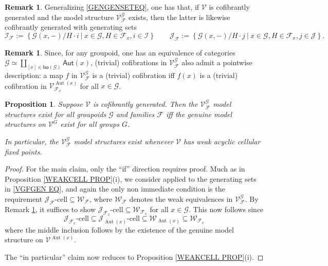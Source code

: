 \documentclass[a4paper,10pt
,draft
]{article}%
\numberwithin{equation}{section}
\numberwithin{figure}{section}
\newtheorem{proposition}[equation]{Proposition}%
\theoremstyle{definition} %
\newtheorem{remark}[equation]{Remark}%
\DeclareMathOperator{\Aut}{Aut}%
\newcommand{\F}{\ensuremath{\mathcal F}}
\newcommand{\V}{\ensuremath{\mathcal V}}
\newcommand{\G}{\ensuremath{\mathcal G}}
\newcommand{\1}{\ensuremath{\mathbbm 1}}%
\begin{document}
\begin{remark}\label{VGFGEN REM}
	Generalizing \eqref{GENGENSETEQ}, one has that,
	if $\V$ is cofibrantly generated and 
	the model structure $\V^{\G}_{\F}$ exists,
	then the latter is likewise cofibrantly generated with generating sets
	\begin{equation}\label{VGFGEN EQ}
	\mathcal I_{\F} := \left\{
	\G(x,-)/H \cdot i
	\ | \ x \in \G, H \in \F_x, i\in \mathcal{I}
	\right\}
	\qquad
	\mathcal J_{\F} := \left\{
	\G(x,-)/H \cdot j
	\ | \ x \in \G, H \in \F_x, j\in \mathcal{J}
	\right\}.
	\end{equation}
\end{remark}


\begin{remark}\label{SIGMACOF_REM}
	Since, for any groupoid, one has an equivalence of categories
	$\mathcal{G} \simeq 
	\coprod_{[x] \in \mathsf{Iso}(\mathcal{G})}
	\mathsf{Aut}(x)$,
	(trivial) cofibrations in $\V^{\G}_{\F}$
	also admit a pointwise description: 
	a map $f$ in $\V^\G_\F$ is a (trivial) cofibration iff $f(x)$ is a (trivial) cofibration in $\V^{\Aut(x)}_{\F_x}$ for all $x \in \G$.
\end{remark}



\begin{proposition}\label{ALLEQ PROP}
	Suppose $\V$ is cofibrantly generated.
	Then the $\V^{\G}_{\F}$
	model structures exist for all 
	groupoids $\G$ and families $\F$
	iff
	the genuine model structures on $\V^G$
	exist for all groups $G$.
	
	In particular, the $\V^{\G}_{\F}$
	model structures exist whenever $\V$ has weak acyclic cellular fixed points.
\end{proposition}

\begin{proof}
	For the main claim, only the ``if'' direction requires proof.
	Much as in Proposition \ref{WEAKCELL PROP}(i), 
	we consider \cite[Theorem 2.1.19]{Hov99}
	applied to the generating sets in \eqref{VGFGEN EQ},
	and again the only non immediate condition is the requirement
	$\mathcal{J}_{\F}\text{-cell} \subseteq \mathcal{W}_{\F}$,
	where $\mathcal{W}_{\F}$ denotes the weak equivalences 
	in $\V^{\G}_{\F}$.
	By Remark \ref{SIGMACOF_REM}, it suffices to show 
	$\mathcal{J}_{\F_x}\text{-cell} \subseteq \mathcal{W}_{\F_x}$
	for all $x \in \G$.
	This now follows since
	\begin{equation}\label{FAMTOGEN EQ}
	\mathcal{J}_{\F_x}\text{-cell} \subseteq 
	\mathcal{J}_{\Aut(x)}\text{-cell} \subseteq 
	\mathcal{W}_{\Aut(x)} \subseteq 
	\mathcal{W}_{\F_x}
	\end{equation}
	where the middle inclusion follows by the existence of the 
	genuine model structure on $\V^{\Aut(x)}$.
	
	The ``in particular'' claim now reduces to Proposition \ref{WEAKCELL PROP}(i).
\end{proof}
\end{document}
